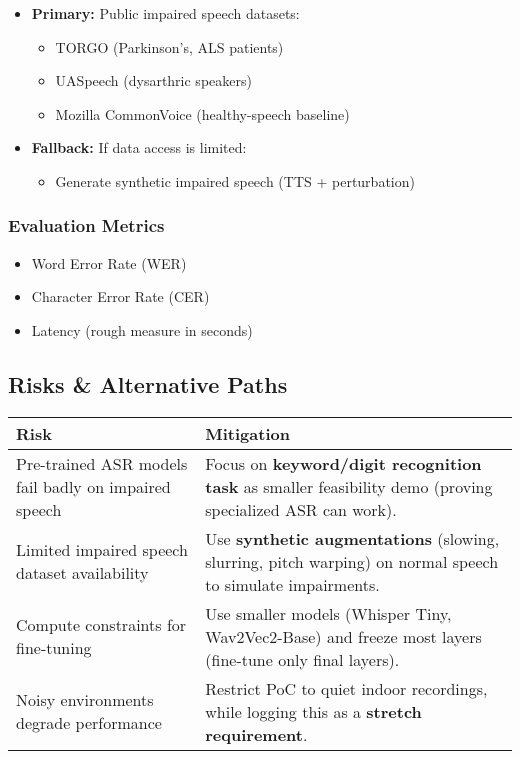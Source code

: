 \documentclass{article}
\begin{document}
\begin{itemize}
    \item \textbf{Primary:} Public impaired speech datasets:
    \begin{itemize}
        \item TORGO (Parkinson's, ALS patients)
        \item UASpeech (dysarthric speakers)
        \item Mozilla CommonVoice (healthy-speech baseline)
    \end{itemize}
    \item \textbf{Fallback:} If data access is limited:
    \begin{itemize}
        \item Generate synthetic impaired speech (TTS + perturbation)
    \end{itemize}
\end{itemize}

\subsubsection{Evaluation Metrics}

\begin{itemize}
    \item Word Error Rate (WER)
    \item Character Error Rate (CER)
    \item Latency (rough measure in seconds)
\end{itemize}

\subsection{Risks \& Alternative Paths}

\begin{tabularx}{\textwidth}{@{}p{} X@{}}
\toprule
Risk & Mitigation \\
\midrule
Pre-trained ASR models fail badly on impaired speech & Focus on \textbf{keyword/digit recognition task} as smaller feasibility demo (proving specialized ASR can work). \\
\hline
Limited impaired speech dataset availability & Use \textbf{synthetic augmentations} (slowing, slurring, pitch warping) on normal speech to simulate impairments. \\
\hline
Compute constraints for fine-tuning & Use smaller models (Whisper Tiny, Wav2Vec2-Base) and freeze most layers (fine-tune only final layers). \\
\hline
Noisy environments degrade performance & Restrict PoC to quiet indoor recordings, while logging this as a \textbf{stretch requirement}. \\
\bottomrule
\end{tabularx}
\end{document}
